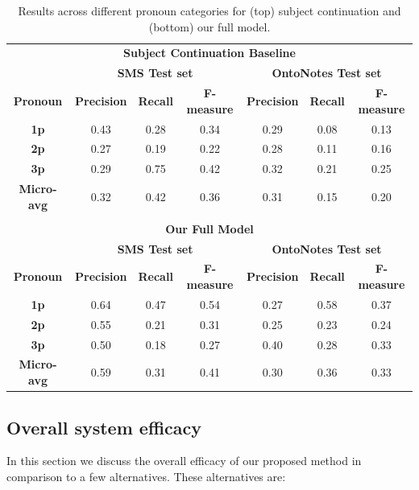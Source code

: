 \documentclass[11pt]{report}
\begin{document}
\begin{table}[t]
\begin{footnotesize}
\begin{center}
\begin{tabular}{|c|c|c|c|c|c|c|}
\hline
\multicolumn{7}{|c|}{\bf Subject Continuation Baseline} \\
\multicolumn{1}{|c|}{} & 
\multicolumn{3}{|c|}{\bf SMS Test set} & 
\multicolumn{3}{|c|}{\bf OntoNotes Test set} \\
\hline 
\bf Pronoun & \bf Precision & \bf Recall & \bf F-measure & \bf Precision & \bf Recall & \bf F-measure\\ \hline 
\bf 1p & 0.43 & 0.28 & 0.34 & 0.29 & 0.08 & 0.13 \\ \hline
\bf 2p & 0.27 & 0.19 & 0.22 & 0.28 & 0.11 & 0.16 \\ \hline
\bf 3p & 0.29 & 0.75 & 0.42 & 0.32 & 0.21 & 0.25 \\ \hline
\bf Micro-avg & 0.32 & 0.42 & 0.36 & 0.31 & 0.15 & 0.20 \\ \hline
\multicolumn{7}{c}{} \\
\hline
\multicolumn{7}{|c|}{\bf Our Full Model} \\
\multicolumn{1}{|c|}{} & 
\multicolumn{3}{|c|}{\bf SMS Test set} & 
\multicolumn{3}{|c|}{\bf OntoNotes Test set} \\
\hline
\bf Pronoun & \bf Precision & \bf Recall & \bf F-measure & \bf Precision & \bf Recall & \bf F-measure\\ \hline 
\bf 1p & 0.64 & 0.47 & 0.54 & 0.27 & 0.58 & 0.37 \\ \hline
\bf 2p & 0.55 & 0.21 & 0.31 & 0.25 & 0.23 & 0.24 \\ \hline
\bf 3p & 0.50 & 0.18 & 0.27 & 0.40 & 0.28 & 0.33 \\ \hline
\bf Micro-avg & 0.59 & 0.31 & 0.41 & 0.30 & 0.36 & 0.33 \\ \hline
\end{tabular}
\end{center}
\end{footnotesize}
\caption{\label{fullresults} Results across different pronoun categories for (top) subject continuation and (bottom) our full model.}
\end{table}


\subsection{Overall system efficacy} \label{efficacy}

In this section we discuss the overall efficacy of our proposed method in comparison to a few alternatives. These alternatives are:
\end{document}
